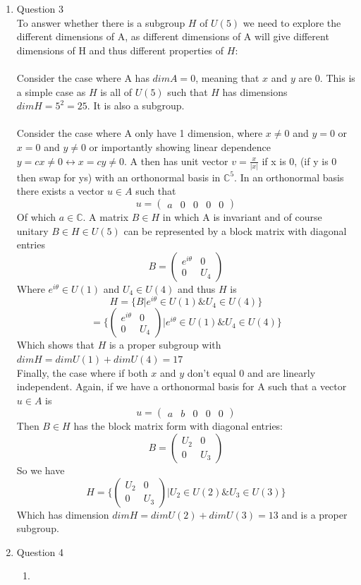 \documentclass[12pt]{article}
\begin{document}
\begin{enumerate}
\item Question 3\\
To answer whether there is a subgroup $H$ of $U(5)$ we need to explore the different dimensions of A, as different dimensions of A will give different dimensions of H and thus different properties of $H$:
\\
\\
Consider the case where A has $dim A =0$, meaning that $x$ and $y$ are 0. This is a simple case as $H$ is all of $U(5)$ such that $H$ has dimensions $dim H = 5^2 = 25$. It is also a subgroup.
\\
\\
Consider the case where A only have 1 dimension, where $x \neq 0 $ and $y=0$ or $x=0$ and $y \neq 0$ or importantly showing linear dependence $y = cx \neq 0 \leftrightarrow x = cy \neq 0 $. A then has unit vector $v = \frac{x}{|x|}$ if x is 0, (if y is 0 then swap for ys) with an orthonormal basis in $\mathbb{C}^5$. In an orthonormal basis there exists a vector $u \in A$ such that
$$ u = \left( \begin{array}{ccccc} a & 0 & 0 & 0 & 0 \end{array} \right) $$
Of which $a \in \mathbb{C}$. A matrix $B \in H$ in which A is invariant and of course unitary $ B \in H \in U(5) $ can be represented by a block matrix with diagonal entries
$$  B = \left( \begin{array}{cc} e^{i\theta} & 0 \\ 0 & U_4 \end{array} \right) $$
Where $e^{i\theta} \in U(1) $ and $U_4 \in U(4) $ and thus $H$ is 
$$ H = \Big\{ B | e^{i\theta} \in U(1) \& U_4 \in U(4) \Big\} $$
$$ = \Big\{ \left( \begin{array}{cc} e^{i\theta} & 0 \\ 0 & U_4 \end{array} \right) | e^{i\theta} \in U(1) \& U_4 \in U(4) \Big\} $$
Which shows that $H$ is a proper subgroup with $dim H = dim U(1) + dim U(4) = 17 $
\\
Finally, the case where if both $x$ and $y$ don't equal 0 and are linearly independent. Again, if we have a orthonormal basis for A such that a vector $u \in A$ is
$$  u = \left( \begin{array}{ccccc} a & b & 0 & 0 & 0 \end{array} \right) $$
Then $B \in H$ has the block matrix form with diagonal entries:
$$ B = \left( \begin{array}{cc} U_2 & 0 \\ 0 & U_3 \end{array} \right) $$
So we have 
$$ H = \Big\{ \left( \begin{array}{cc} U_2 & 0 \\ 0 & U_3 \end{array} \right) | U_2 \in U(2) \& U_3 \in U(3) \Big\} $$
Which has dimension $dim H = dim U(2) + dim U(3) = 13 $ and is a proper subgroup. 
\item Question 4\\
\begin{enumerate}
   \item 


\end{enumerate}
\end{enumerate}
\end{document}
